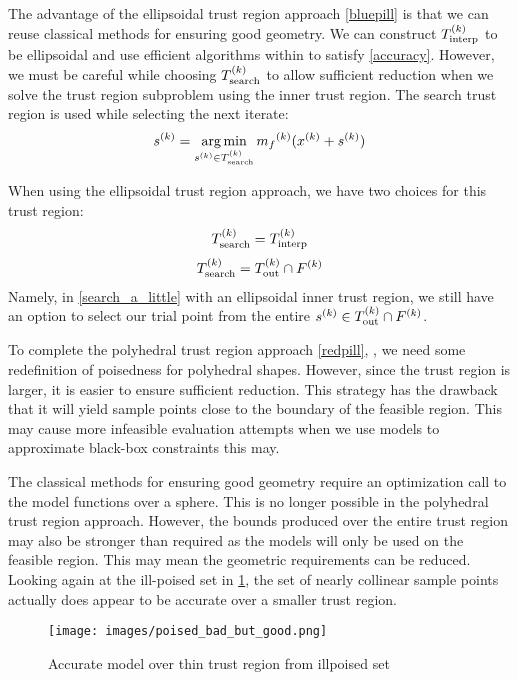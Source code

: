 The advantage of the ellipsoidal trust region approach \cref{bluepill} is that we can reuse classical methods for ensuring good geometry.
We can construct ${T_{\text{interp}}^{(k)}}$ to be ellipsoidal and use efficient algorithms within \cite{DUMMY:intro_book} to satisfy \cref{accuracy}.
However, we must be careful while choosing $ {T_{\text{search}}^{(k)}}$ to allow sufficient reduction when we solve the trust region subproblem using the inner trust region.
The search trust region is used while selecting the next iterate:
\begin{align*}
{{s}^{(k)}} = \operatorname*{arg\,min}_{{{s}^{(k)}} \in {T_{\text{search}}^{(k)}}} {{m}_f}^{(k)}({x^{(k)}} + {{s}^{(k)}})
\end{align*}

\label{which_trust_region}
When using the ellipsoidal trust region approach, we have two choices for this trust region:
\begin{align}
{T_{\text{search}}^{(k)}} = {T_{\text{interp}}^{(k)}} \label{search_a_little}
\end{align}
\begin{align}
{T_{\text{search}}^{(k)}} = {T_{\text{out}}^{(k)}} \cap {F}^{(k)} \label{search_a_lot}
\end{align}
Namely, in \cref{search_a_little} with an ellipsoidal inner trust region, we still have an option to select our trial point from the entire ${{s}^{(k)}} \in {T_{\text{out}}^{(k)}} \cap {F}^{(k)}$.

To complete the polyhedral trust region approach \cref{redpill}, %
, we need some redefinition of poisedness for polyhedral shapes.
However, since the trust region is larger, it is easier to ensure sufficient reduction.
This strategy has the drawback that it will yield sample points close to the boundary of the feasible region.
This may cause more infeasible evaluation attempts when we use models to approximate black-box constraints this may.

The classical methods for ensuring good geometry require an optimization call to the model functions over a sphere.
This is no longer possible in the polyhedral trust region approach.
However, the bounds produced over the entire trust region may also be stronger than required as the models will only be used on the feasible region.
This may mean the geometric requirements can be reduced.
Looking again at the ill-poised set in \cref{aoip}, the set of nearly collinear sample points actually does appear to be accurate over a smaller trust region.


\begin{figure}[h]
    \centering
    \texttt{[image: images/poised\_bad\_but\_good.png]}
    \caption{Accurate model over thin trust region from illpoised set}
    \label{aoip}
\end{figure}


